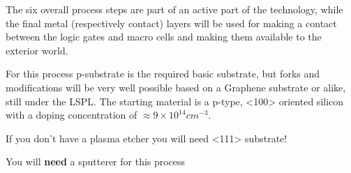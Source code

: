 The six overall process steps are part of an active part of the technology, while the final metal (respectively contact) layers will be used for making a contact between the logic gates and macro cells and making them available to the exterior world.

For this process p-substrate is the required basic substrate, but forks and modifications will be very well possible based on a Graphene substrate or alike, still under the LSPL.
The starting material is a p-type, <100> oriented silicon with a doping concentration of $\approx 9\times10^{14}cm^{-3}$.\\

\begin{mdframed}[linewidth=2pt,linecolor=red]
	If you don't have a plasma etcher you will need <111> substrate!
\end{mdframed}

\begin{mdframed}[linewidth=2pt,linecolor=red]
	You will \textbf{need} a sputterer for this process
\end{mdframed}
